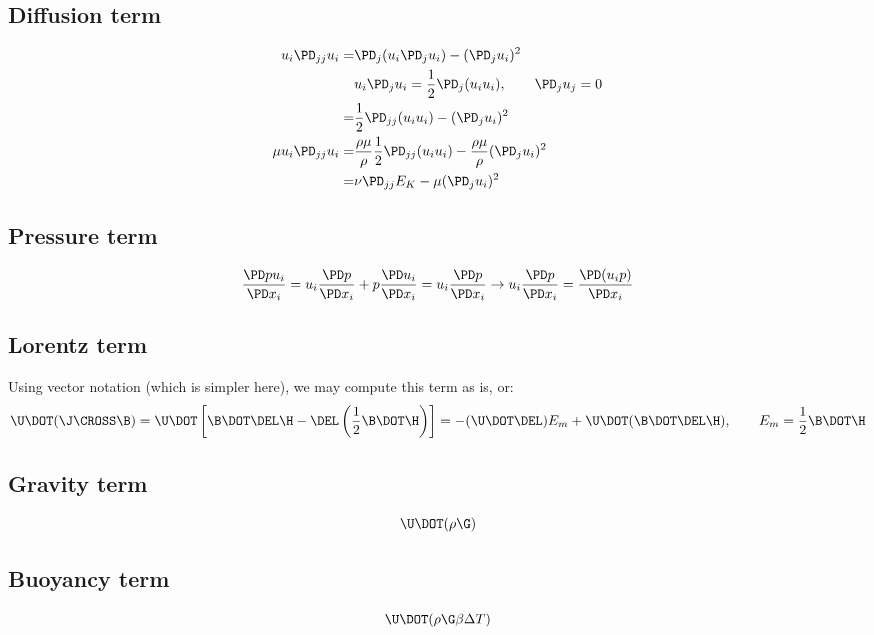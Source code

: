 \documentclass[11pt]{article}
\begin{document}
\subsection{Diffusion term}
\begin{equation}\begin{aligned}
	u_i \PD_{jj} u_i     = & \PD_j (u_i \PD_j u_i ) - (\PD_j u_i)^2  \\
	                       & u_i \PD_j u_i = \frac{1}{2} \PD_j (u_i u_i), \qquad \PD_j u_j = 0 \\
	                     = & \frac{1}{2} \PD_{jj} (u_i u_i) - (\PD_j u_i)^2 \\
	\mu u_i \PD_{jj} u_i = & \frac{\rho \mu}{\rho} \frac{1}{2} \PD_{jj} (u_i u_i) - \frac{\rho \mu}{\rho} (\PD_j u_i)^2 \\
	                     = & \nu \PD_{jj} E_K - \mu (\PD_j u_i)^2 \\
\end{aligned}\end{equation}

\subsection{Pressure term}
\begin{equation}
	\frac{\PD p u_i}{\PD x_i}
	= u_i \frac{\PD p}{\PD x_i}
	+ p \frac{\PD u_i}{\PD x_i}
	= u_i \frac{\PD p}{\PD x_i}
	\rightarrow
	u_i \frac{\PD p}{\PD x_i} =
	\frac{\PD (u_i p)}{\PD x_i}
\end{equation}

\subsection{Lorentz term}
Using vector notation (which is simpler here), we may compute this term as is, or:
\begin{equation}
	\U \DOT (\J \CROSS \B) =
	\U \DOT \left[\B \DOT \DEL \H -\DEL \left( \frac{1}{2} \B \DOT \H \right)\right] =
	- (\U \DOT \DEL) E_m
	+ \U \DOT (\B \DOT \DEL \H)
	,\qquad
	E_m = \frac{1}{2} \B \DOT \H
\end{equation}

\subsection{Gravity term}
\begin{equation}
	\U \DOT (\rho \G)
\end{equation}
\subsection{Buoyancy term}
\begin{equation}
	\U \DOT (\rho \G \beta \Delta T)
\end{equation}
\end{document}

